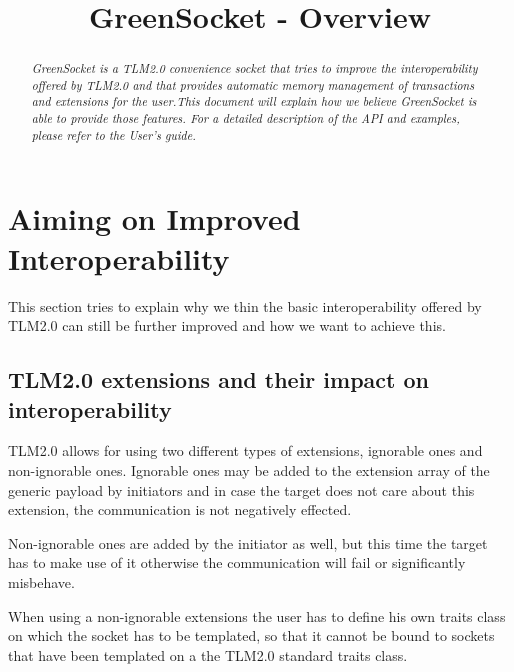 \documentclass[a4paper,10pt]{article}          %
\title{GreenSocket - Overview}
\author{\sffamily{Robert G\"unzel (GreenSocs)}}
\date{}
\begin{document}
\maketitle

\thispagestyle{empty}


\begin{abstract}
\noindent
\emph{GreenSocket is a TLM2.0 convenience socket that tries to improve the interoperability offered by TLM2.0 and that provides automatic memory management of transactions and extensions for the user.This document will explain how we believe GreenSocket is able to provide those features.
For a detailed description of the API and examples, please refer to the User's guide.
}
\end{abstract}

\tableofcontents

\section{Aiming on Improved Interoperability}
This section tries to explain why we thin the basic interoperability offered by TLM2.0 can still be further improved and how we want to achieve this.

\vspace{4mm}
\subsection{TLM2.0 extensions and their impact on interoperability}
\vspace{4mm}

TLM2.0 allows for using two different types of extensions, ignorable ones and non-ignorable ones. Ignorable ones may be added to the extension array of the generic payload by initiators and in case the target does not care about this extension, the communication is not negatively effected.

Non-ignorable ones are added by the initiator as well, but this time the target has to make use of it otherwise the communication will fail or significantly misbehave.

When using a non-ignorable extensions the user has to define his own traits class on which the socket has to be templated, so that it cannot be bound to sockets that have been templated on a the TLM2.0 standard traits class.
\end{document}

